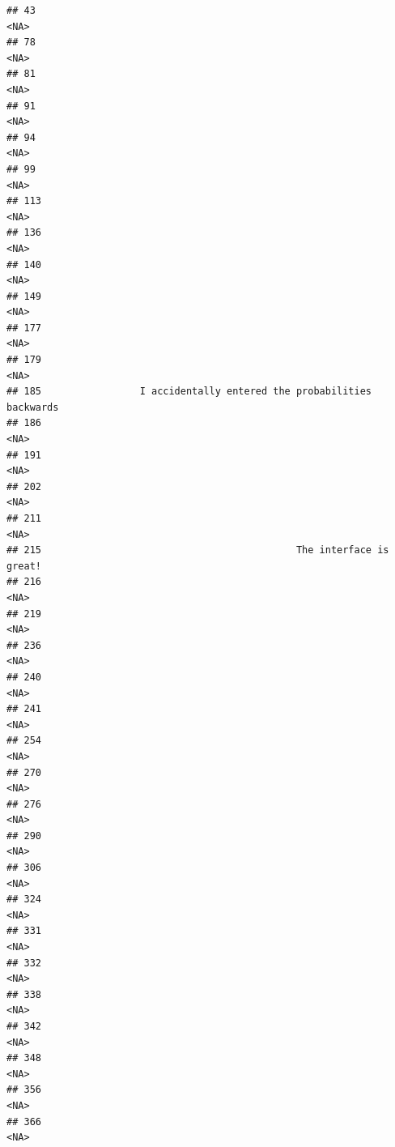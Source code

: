 \documentclass[
]{article}
\begin{document}
\begin{verbatim}
## 43                                                                <NA>
## 78                                                                <NA>
## 81                                                                <NA>
## 91                                                                <NA>
## 94                                                                <NA>
## 99                                                                <NA>
## 113                                                               <NA>
## 136                                                               <NA>
## 140                                                               <NA>
## 149                                                               <NA>
## 177                                                               <NA>
## 179                                                               <NA>
## 185                 I accidentally entered the probabilities backwards
## 186                                                               <NA>
## 191                                                               <NA>
## 202                                                               <NA>
## 211                                                               <NA>
## 215                                            The interface is great!
## 216                                                               <NA>
## 219                                                               <NA>
## 236                                                               <NA>
## 240                                                               <NA>
## 241                                                               <NA>
## 254                                                               <NA>
## 270                                                               <NA>
## 276                                                               <NA>
## 290                                                               <NA>
## 306                                                               <NA>
## 324                                                               <NA>
## 331                                                               <NA>
## 332                                                               <NA>
## 338                                                               <NA>
## 342                                                               <NA>
## 348                                                               <NA>
## 356                                                               <NA>
## 366                                                               <NA>

\end{verbatim}
\end{document}
